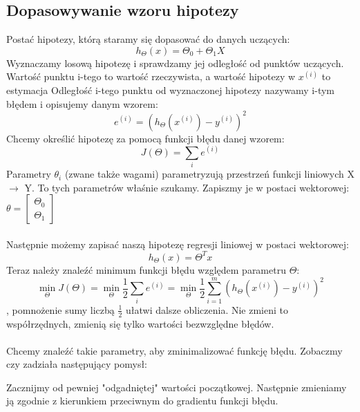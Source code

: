 \documentclass{article}
\begin{document}
\subsection{Dopasowywanie wzoru hipotezy}
Postać hipotezy, którą staramy się dopasować do danych uczących:
\[h_\Theta(x) = \Theta_0 + \Theta_1X\]
Wyznaczamy losową hipotezę i sprawdzamy jej odległość od punktów uczących. Wartość punktu i-tego to wartość rzeczywista, a wartość hipotezy w $x^{(i)}$ to estymacja\newline
Odległość i-tego punktu od wyznaczonej hipotezy nazywamy i-tym błędem i opisujemy danym wzorem:
\[e^{(i)} = {(h_\Theta(x^{(i)}) - y^{(i)})}^2 \]
Chcemy określić hipotezę za pomocą funkcji błędu danej wzorem:
\[J(\Theta) = \sum_{i} e^{(i)}\]
Parametry $\theta_i$ (zwane także wagami) parametryzują przestrzeń funkcji liniowych X $\rightarrow$ Y. To tych parametrów właśnie szukamy.\newline
Zapiszmy je w postaci wektorowej:
$\theta = \begin{bmatrix}
\Theta_0\\
\Theta_1
\end{bmatrix}$
\\
\\
Następnie możemy zapisać naszą hipotezę regresji liniowej w postaci wektorowej:
\[h_\Theta(x) = \Theta^Tx\]
Teraz należy znaleźć minimum funkcji błędu względem parametru $\Theta$:
\[\min_{\Theta}J(\Theta) = \min_{\Theta}\frac{1}{2}\sum_{i}e^{(i)} = \min_{\Theta}\frac{1}{2}\sum_{i=1}^m{(h_\Theta(x^{(i)})-y^{(i)})}^2\]
, pomnożenie sumy liczbą $\frac{1}{2}$ ułatwi dalsze obliczenia. Nie zmieni to współrzędnych, zmienią się tylko wartości bezwzględne błędów.
\\
\\
Chcemy znaleźć takie parametry, aby zminimalizować funkcję błędu. Zobaczmy czy zadziała następujący pomysł:

Zacznijmy od pewniej "odgadniętej" wartości początkowej. Następnie zmieniamy ją zgodnie z kierunkiem przeciwnym do gradientu funkcji błędu.
\end{document}
